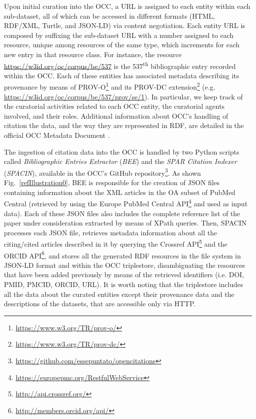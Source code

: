 \documentclass[runningheads,a4paper]{llncs}
\begin{document}
Upon initial curation into the OCC, a URL is assigned to each entity within each sub-dataset, all of which can be accessed in different formats (HTML, RDF/XML, Turtle, and JSON-LD) via content negotiation. Each entity URL is composed by suffixing the sub-dataset URL with a number assigned to each resource, unique among resources of the same type, which increments for each new entry in that resource class. For instance, the resource \url{https://w3id.org/oc/corpus/be/537} is the 537\textsuperscript{th} bibliographic entry recorded within the OCC. Each of these entities has associated metadata describing its provenance by means of PROV-O\footnote{\url{https://www.w3.org/TR/prov-o/}} and its PROV-DC extension\footnote{\url{https://www.w3.org/TR/prov-dc/}} (e.g. \url{https://w3id.org/oc/corpus/be/537/prov/se/1}). In particular, we keep track of the curatorial activities related to each OCC entity, the curatorial agents involved, and their roles. Additional information about OCC's handling of citation the data, and the way they are represented in RDF, are detailed in the official OCC Metadata Document  \cite{__RefNumPara__19_1852566440}.

The ingestion of citation data into the OCC is handled by two Python scripts called {\em Bibliographic Entries Extractor} ({\em BEE}) and the {\em SPAR Citation Indexer} ({\em SPACIN}), available in the OCC's GitHub repository\footnote{\url{https://github.com/essepuntato/opencitations}}. As shown Fig.~\ref{refIllustration0}, BEE is responsible for the creation of JSON files containing information about the XML articles in the OA subset of PubMed Central (retrieved by using the Europe PubMed Central API\footnote{\url{https://europepmc.org/RestfulWebService}} and used as input data). Each of these JSON files also includes the complete reference list of the paper under consideration extracted by means of XPath queries. Then, SPACIN processes each JSON file, retrieves metadata information about all the citing/cited articles described in it by querying the Crossref API\footnote{\url{http://api.crossref.org/}} and the ORCID API\footnote{\url{http://members.orcid.org/api/}}, and stores all the generated RDF resources in the file system in JSON-LD format and within the OCC triplestore, disambiguating the resources that have been added previously by means of the retrieved identifiers (i.e. DOI, PMID, PMCID, ORCID, URL). It is worth noting that the triplestore includes all the data about the curated entities except their provenance data and the descriptions of the datasets, that are accessible only via HTTP.
\end{document}
